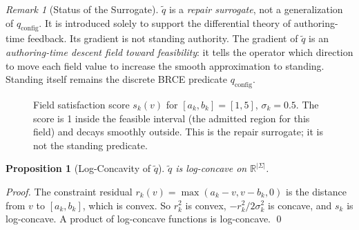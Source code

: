 \documentclass[12pt, letterpaper]{report}
\theoremstyle{plain}
\newtheorem{proposition}[theorem]{Proposition}
\theoremstyle{definition}
\theoremstyle{remark}
\newtheorem{remark}[theorem]{Remark}
\newcommand{\R}{\mathbb{R}}
\newcommand{\qc}{q_{\mathrm{config}}}
\begin{document}
\begin{remark}[Status of the Surrogate]
\label{rem:surrogate}
$\tilde{q}$ is a \emph{repair surrogate}, not a generalization of $\qc$.
It is introduced solely to support the differential theory of authoring-time
feedback. Its gradient is not standing authority.
The gradient of $\tilde{q}$ is an \emph{authoring-time descent field toward
feasibility}: it tells the operator which direction to move each field value
to increase the smooth approximation to standing.
Standing itself remains the discrete BRCE predicate $\qc$.
\end{remark}

\begin{figure}[h]
\centering
{}
\caption{Field satisfaction score $s_k(v)$ for $[a_k,b_k]=[1,5]$,
$\sigma_k=0.5$.
The score is 1 inside the feasible interval (the admitted region for this
field) and decays smoothly outside. This is the repair surrogate;
it is not the standing predicate.}
\label{fig:score}
\end{figure}

\begin{proposition}[Log-Concavity of $\tilde{q}$]
$\tilde{q}$ is log-concave on $\R^{|\Sigma|}$.
\end{proposition}

\begin{proof}
The constraint residual $r_k(v) = \max(a_k - v, v - b_k, 0)$ is the
distance from $v$ to $[a_k, b_k]$, which is convex.
So $r_k^2$ is convex, $-r_k^2 / 2\sigma_k^2$ is concave, and $s_k$ is
log-concave.
A product of log-concave functions is log-concave. \qed
\end{proof}
\end{document}
